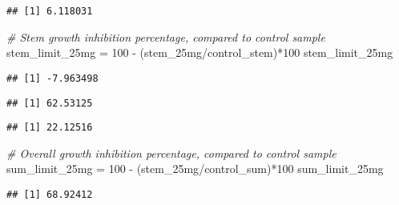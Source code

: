 \documentclass[
]{article}
\newenvironment{Shaded}{\begin{snugshade}}{\end{snugshade}}
\newcommand{\CommentTok}[1]{\textcolor[rgb]{0.56,0.35,0.01}{\textit{#1}}}
\newcommand{\DecValTok}[1]{\textcolor[rgb]{0.00,0.00,0.81}{#1}}
\newcommand{\FunctionTok}[1]{\textcolor[rgb]{0.00,0.00,0.00}{#1}}
\newcommand{\NormalTok}[1]{#1}
\newcommand{\OtherTok}[1]{\textcolor[rgb]{0.56,0.35,0.01}{#1}}
\newcommand{\SpecialCharTok}[1]{\textcolor[rgb]{0.00,0.00,0.00}{#1}}
\begin{document}
\begin{verbatim}
## [1] 6.118031
\end{verbatim}

\begin{Shaded}
\begin{Highlighting}[]
\CommentTok{\# Stem growth inhibition percentage, compared to control sample}
\NormalTok{stem\_limit\_25mg }\OtherTok{=} \DecValTok{100} \SpecialCharTok{{-}}\NormalTok{ (stem\_25mg}\SpecialCharTok{/}\NormalTok{control\_stem)}\SpecialCharTok{*}\DecValTok{100}
\NormalTok{stem\_limit\_25mg}
\end{Highlighting}
\end{Shaded}

\begin{verbatim}
## [1] -7.963498
\end{verbatim}

\begin{Shaded}
\end{Shaded}

\begin{verbatim}
## [1] 62.53125
\end{verbatim}

\begin{Shaded}
\end{Shaded}

\begin{verbatim}
## [1] 22.12516
\end{verbatim}

\begin{Shaded}
\begin{Highlighting}[]
\CommentTok{\# Overall growth inhibition percentage, compared to control sample}
\NormalTok{sum\_limit\_25mg }\OtherTok{=} \DecValTok{100} \SpecialCharTok{{-}}\NormalTok{ (stem\_25mg}\SpecialCharTok{/}\NormalTok{control\_sum)}\SpecialCharTok{*}\DecValTok{100}
\NormalTok{sum\_limit\_25mg}
\end{Highlighting}
\end{Shaded}

\begin{verbatim}
## [1] 68.92412
\end{verbatim}
\end{document}
